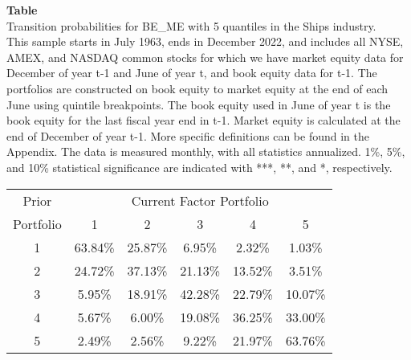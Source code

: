 \begin{table*}[ht!]
\raggedright
{}
\label{tab: transition_probs_BE_ME_Ships_with_5_quantiles}
\textbf{Table \thetable} \\
Transition probabilities for BE_ME with 5 quantiles in the Ships industry. \\
\hspace*{1em}This sample starts in July 1963, ends in December 2022, and includes all NYSE, AMEX, and NASDAQ common stocks for which we have market equity data for December of year t-1 and June of year t, and book equity data for t-1. The portfolios are constructed on book equity to market equity at the end of each June using quintile breakpoints.  The book equity used in June of year t is the book equity for the last fiscal year end in t-1.  Market equity is calculated at the end of December of year t-1.  More specific definitions can be found in the Appendix.  The data is measured monthly, with all statistics annualized.  1\%, 5\%, and 10\% statistical significance are indicated with ***, **, and *, respectively. \\
\vspace{0.5em}
\centering
\begin{adjustbox}{max width=\textwidth}
\begin{tabular}{@{}cccccc@{}}
\toprule
Prior & \multicolumn{5}{c}{Current Factor Portfolio} \\
Portfolio & 1 & 2 & 3 & 4 & 5 \\
\midrule
1 & 63.84\% & 25.87\% & 6.95\% & 2.32\% & 1.03\% \\
2 & 24.72\% & 37.13\% & 21.13\% & 13.52\% & 3.51\% \\
3 & 5.95\% & 18.91\% & 42.28\% & 22.79\% & 10.07\% \\
4 & 5.67\% & 6.00\% & 19.08\% & 36.25\% & 33.00\% \\
5 & 2.49\% & 2.56\% & 9.22\% & 21.97\% & 63.76\% \\
\bottomrule
\end{tabular}
\end{adjustbox}
\end{table*}